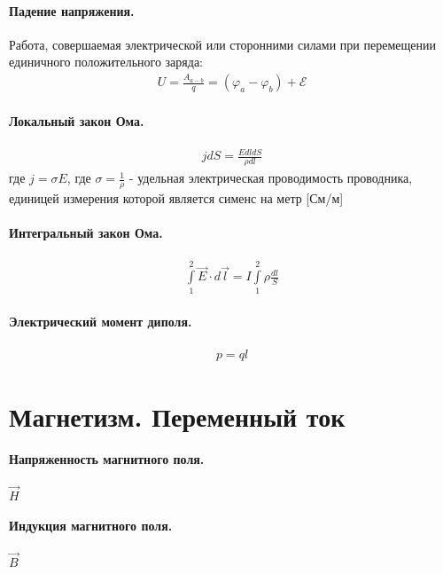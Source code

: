 \documentclass[12pt]{extarticle}
\begin{document}
\paragraph{Падение напряжения.} Работа,
совершаемая электрической или сторонними силами при перемещении
единичного положительного заряда:
\begin{eqnarray*}
    U=\frac{A_{a-b}}{q}=(\varphi_{a}-\varphi_{b})+\mathscr{E}
\end{eqnarray*}

\paragraph{Локальный закон Ома.}
\begin{eqnarray*}
jdS=\frac{EdldS}{\rho dl}
\end{eqnarray*}
где $j=\sigma E$, где $\sigma=\frac{1}{\rho}$ - удельная электрическая
проводимость проводника, единицей измерения которой является сименс на
метр [См/м]

\paragraph{Интегральный закон Ома.}
\begin{eqnarray*}
    \int\limits_{1}^{2}\vec{E}\cdot d\vec{l}
    =I\int\limits_{1}^{2}\rho\frac{dl}{S}
\end{eqnarray*}

\paragraph{Электрический момент диполя.}
\begin{eqnarray*}
p=ql
\end{eqnarray*}



\section{Магнетизм. Переменный ток}
\paragraph{Напряженность магнитного поля.} $\vec{H}$

\paragraph{Индукция магнитного поля.}
$\vec{B}$
\end{document}
